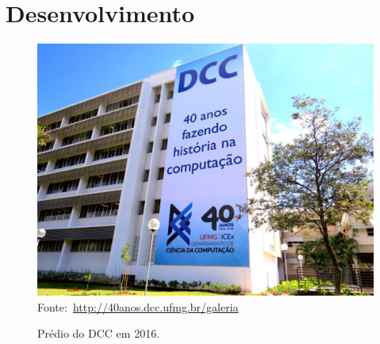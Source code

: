 \documentclass[
	msc, %
	portugues %
]{../ppgccufmg}
\begin{document}
	\chapter{Desenvolvimento}
		\lipsum[1-4]
		
%	
		
		\begin{figure}[ht]
			\centering
			\caption{Prédio do DCC em 2016.}
			\label{fig:exemplo}
			\includegraphics[width=\textwidth]{img/dcc.jpg}
			\small{Fonte:~\url{http://40anos.dcc.ufmg.br/galeria}}
		\end{figure}
	
		\lipsum[5]
		
\end{document}
